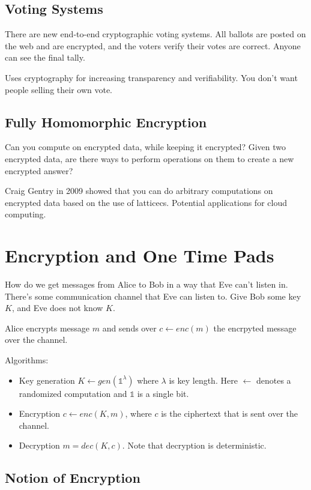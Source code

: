 \documentclass[psamsfonts]{amsart}
\begin{document}
\subsection{Voting Systems}

There are new end-to-end cryptographic voting systems. All ballots are posted on the web and are encrypted, and the voters verify their votes are correct. Anyone can see the final tally. 

Uses cryptography for increasing transparency and verifiability. You don't want people selling their own vote. 

\subsection{Fully Homomorphic Encryption}

Can you compute on encrypted data, while keeping it encrypted? Given two encrypted data, are there ways to perform operations on them to create a new encrypted answer?

Craig Gentry in 2009 showed that you can do arbitrary computations on encrypted data based on the use of latticecs. Potential applications for cloud computing.

\section{Encryption and One Time Pads}

How do we get messages from Alice to Bob in a way that Eve can't listen in. There's some communication channel that Eve can listen to. Give Bob some key $K$, and Eve does not know $K$. 

Alice encrypts message $m$ and sends over $c \leftarrow enc(m)$ the encrpyted message over the channel.

Algorithms: 
\begin{itemize}
\item Key generation $K \leftarrow gen(\mathbb{1}^\lambda)$ where $\lambda$ is key length. Here $\leftarrow$ denotes a randomized computation and $\mathbb{1}$ is a single bit. 
\item Encryption $c \leftarrow enc(K, m)$, where $c$ is the ciphertext that is sent over the channel.
\item Decryption $m = dec(K, c)$. Note that decryption is deterministic. 
\end{itemize}

\subsection{Notion of Encryption}
\end{document}
